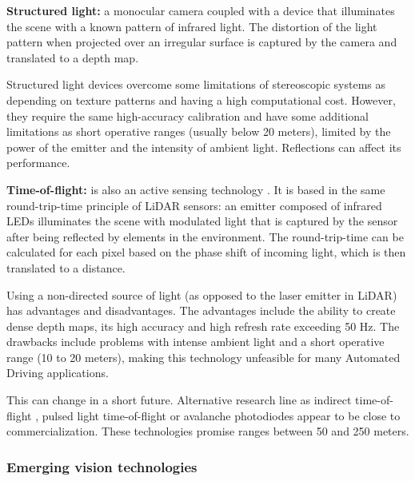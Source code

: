     
\textbf{Structured light:} a monocular camera coupled with a device that
illuminates the scene with a known pattern of infrared light. 
The distortion of the light pattern when projected over an irregular 
surface is captured by the camera and translated to a depth map.

Structured light devices overcome some limitations of stereoscopic systems
as depending on texture patterns and having a high computational cost. 
However, they require the same high-accuracy calibration \cite{Garbat2013}
and have some additional limitations as short operative ranges (usually 
below 20 meters), limited by the power of the emitter and the intensity of 
ambient light. Reflections can affect its performance.


\textbf{Time-of-flight:} is also an active sensing technology 
\cite{Hansard2013}. It is based in the same round-trip-time principle 
of LiDAR sensors: an emitter composed of infrared LEDs illuminates the scene
with modulated light that is captured by the sensor after being reflected by 
elements in the environment. 
The round-trip-time can be calculated for each pixel based on the phase shift 
of incoming light, which is then translated to a distance.

Using a non-directed source of light (as opposed to the laser emitter in 
LiDAR) has advantages and disadvantages. 
The advantages include the ability to create dense depth maps, its high 
accuracy and high refresh rate exceeding 50 Hz. The drawbacks include 
problems with intense ambient light and a short operative range (10 to 20 
meters), making this technology unfeasible for many Automated 
Driving applications.

This can change in a short future. Alternative research line as indirect
time-of-flight \cite{Villa2017}, pulsed light time-of-flight or avalanche
photodiodes \cite{Panasonic2018} appear to be close to commercialization. 
These technologies promise ranges between 50 and 250 meters.
    


\subsubsection{Emerging vision technologies}

